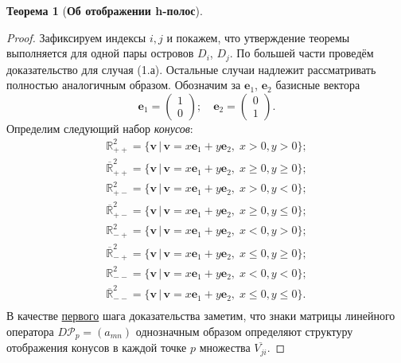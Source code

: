 \documentclass{article}
\newtheorem*{theorem}{Теорема}
\begin{document}
\begin{theorem}[{\bf Об отображении h-полос}]
\end{theorem}

\begin{proof}

Зафиксируем индексы $i, j$ и покажем, что утверждение теоремы выполняется для одной пары островов $D_i$, $D_j$.
По большей части проведём доказательство для случая (1.а).
Остальные случаи надлежит рассматривать полностью аналогичным образом.
Обозначим за $\mathbf{e}_1$, $\mathbf{e}_2$ базисные вектора
\begin{equation}
	\mathbf{e}_1 = \begin{pmatrix} 1 \\ 0 \end{pmatrix}; \quad \mathbf{e}_2 = \begin{pmatrix} 0 \\ 1 \end{pmatrix}.
\end{equation}
Определим следующий набор {\it конусов}:
\begin{align*}
	\mathbb{R}_{++}^2 = \{ \mathbf{v} \, | \, \mathbf{v} = x \mathbf{e}_1 + y \mathbf{e}_2, \; x > 0, y > 0 \}; \\
	\overline{\mathbb{R}}_{++}^2 = \{ \mathbf{v} \, | \, \mathbf{v} = x \mathbf{e}_1 + y \mathbf{e}_2, \; x \ge 0, y \ge 0 \}; \\
	\mathbb{R}_{+-}^2 = \{ \mathbf{v} \, | \, \mathbf{v} = x \mathbf{e}_1 + y \mathbf{e}_2, \; x > 0, y < 0 \}; \\
	\overline{\mathbb{R}}_{+-}^2 = \{ \mathbf{v} \, | \, \mathbf{v} = x \mathbf{e}_1 + y \mathbf{e}_2, \; x \ge 0, y \le 0 \}; \\
	\mathbb{R}_{-+}^2 = \{ \mathbf{v} \, | \, \mathbf{v} = x \mathbf{e}_1 + y \mathbf{e}_2, \; x < 0, y > 0 \}; \\
	\overline{\mathbb{R}}_{-+}^2 = \{ \mathbf{v} \, | \, \mathbf{v} = x \mathbf{e}_1 + y \mathbf{e}_2, \; x \le 0, y \ge 0 \}; \\
	\mathbb{R}_{--}^2 = \{ \mathbf{v} \, | \, \mathbf{v} = x \mathbf{e}_1 + y \mathbf{e}_2, \; x < 0, y < 0 \}; \\
	\overline{\mathbb{R}}_{--}^2 = \{ \mathbf{v} \, | \, \mathbf{v} = x \mathbf{e}_1 + y \mathbf{e}_2, \; x \le 0, y \le 0 \}. \\
\end{align*}
В качестве \underline{первого} шага доказательства заметим, что знаки матрицы линейного оператора $D \mathcal{P}_p = ( a_{mn} )$ однозначным образом определяют структуру отображения конусов в каждой точке $p$ множества $\overline{V_{ji}}$.

\end{proof}
\end{document}
